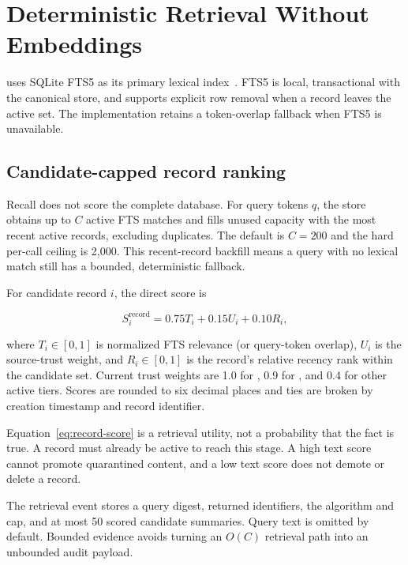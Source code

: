 \section{Deterministic Retrieval Without Embeddings}
\label{sec:retrieval}

\system{} uses SQLite FTS5 as its primary lexical index~\cite{sqlitefts5}. FTS5 is local, transactional with the canonical store, and supports explicit row removal when a record leaves the active set. The implementation retains a token-overlap fallback when FTS5 is unavailable.

\subsection{Candidate-capped record ranking}

Recall does not score the complete database. For query tokens $q$, the store obtains up to $C$ active FTS matches and fills unused capacity with the most recent active records, excluding duplicates. The default is $C=200$ and the hard per-call ceiling is 2,000. This recent-record backfill means a query with no lexical match still has a bounded, deterministic fallback.

For candidate record $i$, the direct score is

\begin{equation}
S_i^{\mathrm{record}}=0.75T_i+0.15U_i+0.10R_i,
\label{eq:record-score}
\end{equation}

where $T_i\in[0,1]$ is normalized FTS relevance (or query-token overlap), $U_i$ is the source-trust weight, and $R_i\in[0,1]$ is the record's relative recency rank within the candidate set. Current trust weights are 1.0 for , 0.9 for , and 0.4 for other active tiers. Scores are rounded to six decimal places and ties are broken by creation timestamp and record identifier.

Equation~\ref{eq:record-score} is a retrieval utility, not a probability that the fact is true. A record must already be active to reach this stage. A high text score cannot promote quarantined content, and a low text score does not demote or delete a record.

The retrieval event stores a query digest, returned identifiers, the algorithm and cap, and at most 50 scored candidate summaries. Query text is omitted by default. Bounded evidence avoids turning an $O(C)$ retrieval path into an unbounded audit payload.

